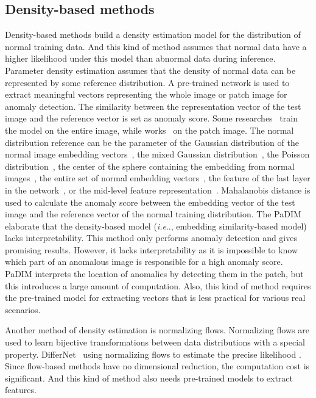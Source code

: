 \documentclass[lettersize,journal]{IEEEtran}
\makeatletter
\DeclareRobustCommand\onedot{\futurelet\@let@token\@onedot}
\def\@onedot{\ifx\@let@token.\else.\null\fi\xspace}
\def\ie{\emph{i.e}\onedot} \def\Ie{\emph{I.e}\onedot}
\makeatother
\begin{document}
\subsection{Density-based methods}
Density-based methods build a density estimation model for the distribution of normal training data. And this kind of method assumes that normal data have a higher likelihood under this model than abnormal data during inference. Parameter density estimation assumes that the density of normal data can be represented by some reference distribution.
A pre-trained network is used to extract meaningful vectors representing the whole image or patch image for anomaly detection. The similarity between the representation vector of the test image and the reference vector is set as anomaly score. Some researches~\cite{andrews2016transfer, nazare2018pre, bergman2019classification, rippel2021modeling, yang2020dfr, zeng2021reference} train the model on the entire image, while works~\cite{zhang2013region, yi2020patch, defard2021padim, bergmann2020uninformed} on the patch image.
The normal distribution reference can be the parameter of the Gaussian distribution of the normal image embedding vectors~\cite{chen2021unsupervised, defard2021padim}, the mixed Gaussian distribution~\cite{eskin2000anomaly,redner1984mixture}, the Poisson distribution~\cite{turcotte2016poisson}, the center of the sphere containing the embedding from normal images~\cite{ruff2018deep, yi2020patch}, the entire set of normal embedding vectors~\cite{cohen2020sub, bergman2020deep}, the feature of the last layer in the network~\cite{chen2001one, sabokrou2018deep}, or the mid-level feature representation~\cite{roth2022towards}. Mahalanobis distance is used to calculate the anomaly score between the embedding vector of the test image and the reference vector of the normal training distribution. 
The PaDIM\cite{defard2021padim} elaborate that the density-based model (\ie, embedding similarity-based model) lacks interpretability. This method only performs anomaly detection and gives promising results. However, it lacks interpretability as it is impossible to know which part of an anomalous image is responsible for a high anomaly score. PaDIM interprets the location of anomalies by detecting them in the patch, but this introduces a large amount of computation.
Also, this kind of method requires the pre-trained model for extracting vectors that is less practical for various real scenarios.

Another method of density estimation is normalizing flows. Normalizing flows are used to learn bijective transformations between data distributions with a special property. DifferNet~\cite{rudolph2021same} using normalizing flows to estimate the precise likelihood . Since flow-based methods have no dimensional reduction, the computation cost is significant. And this kind of method also needs pre-trained models to extract features.
\end{document}
